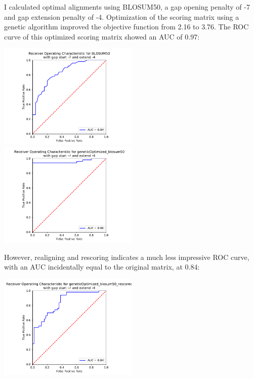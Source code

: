 \documentclass[]{article}
\begin{document}
I calculated optimal alignments using BLOSUM50, a gap opening penalty of -7 and gap extension penalty of -4. Optimization of the scoring matrix using a genetic algorithm improved the objective function from 2.16 to 3.76. The ROC curve of this optimized scoring matrix showed an AUC of 0.97:

\vspace{1em}
\includegraphics[width=0.5\textwidth]{../BMI203_HW3_alignment/plots/ROC_blosum50.pdf}
\includegraphics[width=0.5\textwidth]{../BMI203_HW3_alignment/plots/ROC_geneticOptimized_blosum50.pdf}
\vspace{1em}

However, realigning and rescoring indicates a much less impressive ROC curve, with an AUC incidentally equal to the original matrix, at 0.84: 

\vspace{1em}
\includegraphics[width=0.5\textwidth]{../BMI203_HW3_alignment/plots/ROC_geneticOptimized_blosum50_rescored.pdf}
\vspace{1em}
\end{document}
